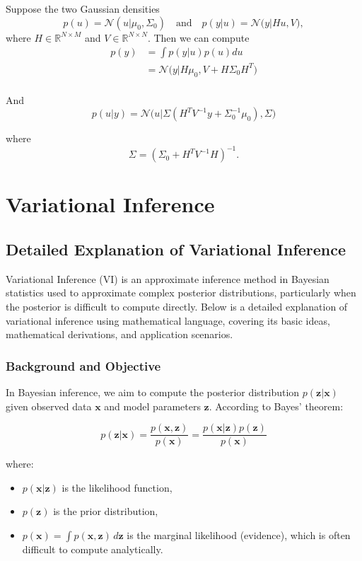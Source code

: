 \documentclass[10pt]{elegantbook}
\begin{document}
\begin{theorem}
Suppose the two Gaussian densities  
\[
p(u) = \mathcal{N}(u | \mu_0, \Sigma_0) \quad \text{and} \quad p(y|u) = \mathcal{N}\big(y \big| H u, V \big),
\]
where $ H \in \mathbb{R}^{N \times M} $ and $ V \in \mathbb{R}^{N \times N} $.  
Then we can compute
\[
\begin{aligned}
    p(y) &= \int p(y|u)  p(u)  du \\
    &= \mathcal{N} \big( y \big| H \mu_0,  V + H \Sigma_0 H^T \big) \\
\end{aligned}
\]

And
\[
    p(u|y) = \mathcal{N} \big( u \big| \Sigma \left( H^T V^{-1} y + \Sigma_0^{-1} \mu_0 \right),  \Sigma \big)
\]

where
\[
\Sigma = \left( \Sigma_0 + H^T V^{-1} H \right)^{-1}.
\]
\end{theorem}

\chapter{Variational Inference}

\section{Detailed Explanation of Variational Inference}

Variational Inference (VI) is an approximate inference method in Bayesian statistics used to approximate complex posterior distributions, particularly when the posterior is difficult to compute directly. Below is a detailed explanation of variational inference using mathematical language, covering its basic ideas, mathematical derivations, and application scenarios.

\subsection{Background and Objective}

In Bayesian inference, we aim to compute the posterior distribution \( p(\mathbf{z} | \mathbf{x}) \) given observed data \( \mathbf{x} \) and model parameters \( \mathbf{z} \). According to Bayes' theorem:

\[
p(\mathbf{z} | \mathbf{x}) = \frac{p(\mathbf{x}, \mathbf{z})}{p(\mathbf{x})} = \frac{p(\mathbf{x} | \mathbf{z}) p(\mathbf{z})}{p(\mathbf{x})}
\]

where:
\begin{itemize}
    \item \( p(\mathbf{x} | \mathbf{z}) \) is the likelihood function,
    \item \( p(\mathbf{z}) \) is the prior distribution,
    \item \( p(\mathbf{x}) = \int p(\mathbf{x}, \mathbf{z}) \, d\mathbf{z} \) is the marginal likelihood (evidence), which is often difficult to compute analytically.
\end{itemize}
\end{document}
